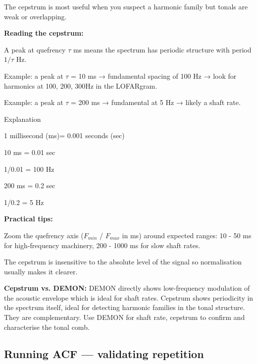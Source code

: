 The cepstrum is most useful when you suspect a harmonic family but tonals are weak or overlapping.

\textbf{Reading the cepstrum:}

\begin{compactitem}
    \item A peak at quefrency $\tau$ ms means the spectrum has periodic structure with period $1/\tau$ Hz.
    \item Example: a peak at $\tau$ = 10 ms → fundamental spacing of 100 Hz → look for harmonics at 100, 200, 300Hz in the LOFARgram.
    \item Example: a peak at $\tau$ = 200 ms → fundamental at 5 Hz → likely a shaft rate.
\end{compactitem}

Explanation

\begin{compactenum}
    \item 1 millisecond (ms)= 0.001 seconds (sec)
    \item 10 ms = 0.01 sec
    \item 1/0.01 = 100 Hz
    \item 200 ms = 0.2 sec
    \item 1/0.2 = 5 Hz 
\end{compactenum}

\textbf{Practical tips:}

\begin{compactitem}
\item Zoom the quefrency axis ($F_{min}$ / $F_{max}$ in ms) around expected ranges: 10 - 50 ms for high-frequency machinery, 200 - 1000 ms for slow shaft rates.
\item The cepstrum is insensitive to the absolute level of the signal so normalisation usually makes it clearer.
\end{compactitem}

\textbf{Cepstrum vs. DEMON:} DEMON directly shows low-frequency modulation of the acoustic envelope which is ideal for shaft rates. Cepstrum shows periodicity in the spectrum itself, ideal for detecting harmonic families in the tonal structure. They are complementary. Use DEMON for shaft rate, cepstrum to confirm and characterise the tonal comb.

\subsection{Running ACF — validating repetition}

